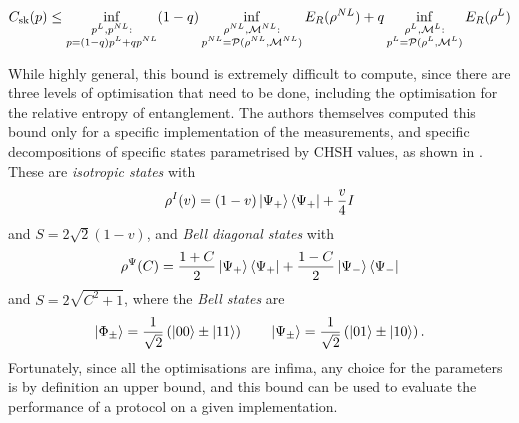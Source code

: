 \documentclass[10pt, a4paper]{article}
\numberwithin{equation}{section} %
\theoremstyle{definition}
\theoremstyle{plain}
\newcommand{\?}{\mathrel{?}} %
\newcommand{\sM}{\mathcal{M}}
\newcommand{\cP}{\mathcal{P}}
\newcommand{\sk}{\rm sk}
\begin{document}
        \[ C_{\sk}(p) \leq \inf_{\substack{p^{L}, p^{NL} : \\ p = (1-q)p^{L} + qp^{NL}}} (1-q) \inf_{\substack{\rho^{NL}, \sM^{NL} : \\ p^{NL} = \cP(\rho^{NL}, \sM^{NL}) }} E_R(\rho^{NL}) + q \inf_{\substack{\rho^{L}, \sM^{L} : \\ p^{L} = \cP(\rho^{L}, \sM^{L}) }} E_R(\rho^L) \]

      While highly general, this bound is extremely difficult to compute, since there are three levels of optimisation that need to be done, including the optimisation for the relative entropy of entanglement. The authors themselves computed this bound only for a specific implementation of the measurements, and specific decompositions of specific states parametrised by CHSH values, as shown in . These are \emph{isotropic states} with
      \begin{equation}
        \rho^{I}(v) = (1-v)\ket{\Psi_+}\bra{\Psi_+} + \frac{v}{4}I
      \end{equation}
      and \(S = 2\sqrt{2}(1-v)\), and \emph{Bell diagonal states} with
      \begin{equation}
        \rho^{\Psi}(C) = \frac{1+C}{2}\ket{\Psi_+}\bra{\Psi_+} + \frac{1-C}{2}\ket{\Psi_-}\bra{\Psi_-}
      \end{equation}
      and \(S = 2\sqrt{C^2+1}\), where the \emph{Bell states} are
      \begin{equation}
        \ket{\Phi_{\pm}} = \frac{1}{\sqrt{2}}\left( \ket{00} \pm \ket{11} \right) \qquad \ket{\Psi_{\pm}} = \frac{1}{\sqrt{2}}\left( \ket{01} \pm \ket{10} \right).
      \end{equation}
      Fortunately, since all the optimisations are infima, any choice for the parameters is by definition an upper bound, and this bound can be used to evaluate the performance of a protocol on a given implementation.

\end{document}
